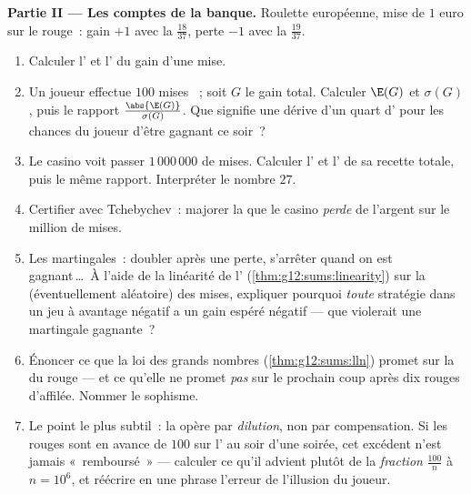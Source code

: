 \begin{problem}
\medskip
\noindent\textbf{Partie II --- Les comptes de la banque.}
Roulette européenne, mise de $1$ euro sur le rouge~: gain $+1$ avec
la  $\frac{18}{37}$, perte $-1$ avec la 
$\frac{19}{37}$.
\begin{enumerate}[resume]
  \item Calculer l' et l' du gain d'une mise.
  \item Un joueur effectue $100$ mises ~; soit $G$ le
        gain total. Calculer $\E(G)$ et $\sigma(G)$, puis le rapport
        $\frac{\abs{\E(G)}}{\sigma(G)}$. Que signifie une dérive
        d'un quart d' pour les chances du joueur d'être
        gagnant ce soir~?
  \item Le casino voit passer $1\,000\,000$ de mises. Calculer
        l' et l' de sa recette totale, puis le
        même rapport. Interpréter le nombre $27$.
  \item Certifier avec Tchebychev~: majorer la  que le
        casino \emph{perde} de l'argent sur le million de mises.
  \item Les martingales~: doubler après une perte, s'arrêter quand
        on est gagnant\,\dots\ À l'aide de la linéarité de
        l' (\cref{thm:g12:sums:linearity}) sur la 
        (éventuellement aléatoire) des mises, expliquer pourquoi
        \emph{toute} stratégie dans un jeu à avantage négatif a un
        gain espéré négatif --- que violerait une martingale
        gagnante~?
  \item Énoncer ce que la loi des grands nombres
        (\cref{thm:g12:sums:lln}) promet sur la  du rouge
        --- et ce qu'elle ne promet \emph{pas} sur le prochain coup
        après dix rouges d'affilée. Nommer le sophisme.
  \item Le point le plus subtil~: la  opère par \emph{dilution},
        non par compensation. Si les rouges sont en avance de $100$
        sur l' au soir d'une soirée, cet excédent n'est
        jamais «~remboursé~» --- calculer ce qu'il advient plutôt de
        la \emph{fraction} $\frac{100}{n}$ à $n = 10^6$, et
        réécrire en une phrase l'erreur de l'illusion du joueur.
\end{enumerate}


\end{problem}
